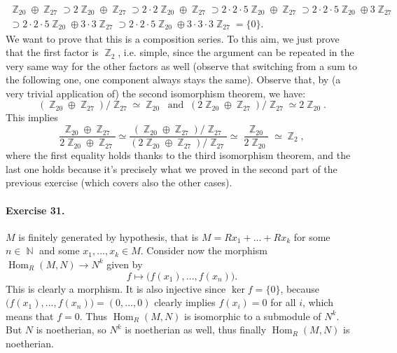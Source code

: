 \documentclass[12pt,a4paper]{report}
\theoremstyle{definition}
\theoremstyle{num.custom-title}
\DeclareMathOperator{\Hom}{Hom}
\DeclareMathOperator{\N}{\mathbb{N}}
\DeclareMathOperator{\Z}{\mathbb{Z}}
\begin{document}
\begin{multline*}
\Z_{20} \oplus \Z_{27} \supset 2\Z_{20} \oplus \Z_{27} \supset 2 \cdot 2\Z_{20} \oplus \Z_{27} \supset 2 \cdot 2 \cdot 5 \Z_{20} \oplus \Z_{27} \supset 2 \cdot 2 \cdot 5 \Z_{20} \oplus 3 \Z_{27} \\
\supset 2 \cdot 2 \cdot 5 \Z_{20} \oplus 3 \cdot 3 \Z_{27} \supset 2 \cdot 2 \cdot 5 \Z_{20} \oplus 3 \cdot 3 \cdot 3 \Z_{27} = \{0\}.
\end{multline*}
We want to prove that this is a composition series. To this aim, we just prove that the first factor is $\Z_2$, i.e. simple, since the argument can be repeated in the very same way for the other factors as well (observe that switching from a sum to the following one, one component always stays the same). Observe that, by (a very trivial application of) the second isomorphism theorem, we have:
\[
(\Z_{20} \oplus \Z_{27}) / \Z_{27} \simeq \Z_{20} \ \text{ and } \ (2\Z_{20} \oplus \Z_{27}) / \Z_{27} \simeq 2\Z_{20}.
\]
This implies
\[
\frac{\Z_{20} \oplus \Z_{27}}{2\Z_{20} \oplus \Z_{27}} \simeq \frac{(\Z_{20} \oplus \Z_{27}) / \Z_{27}}{(2\Z_{20} \oplus \Z_{27}) / \Z_{27}} \simeq \frac{\Z_{20}}{2\Z_{20}} \simeq \Z_2,
\]
where the first equality holds thanks to the third isomorphism theorem, and the last one holds because it's precisely what we proved in the second part of the previous exercise (which covers also the other cases).

\paragraph{Exercise 31.} $M$ is finitely generated by hypothesis, that is $M=Rx_1+...+Rx_k$ for some $n \in \N$ and some $x_1,...,x_k \in M$. Consider now the morphism $\Hom_R(M,N) \to N^k$ given by
\[
f \mapsto \big( f(x_1),...,f(x_n) \big).
\]
This is clearly a morphism. It is also injective since $\ker f = \{0\}$, because $\big( f(x_1),...,f(x_n) \big) = (0,...,0)$ clearly implies $f(x_i)=0$ for all $i$, which means that $f=0$. Thus $\Hom_R(M,N)$ is isomorphic to a submodule of $N^k$. But $N$ is noetherian, so $N^k$ is noetherian as well, thus finally $\Hom_R(M,N)$ is noetherian.\\
\end{document}
